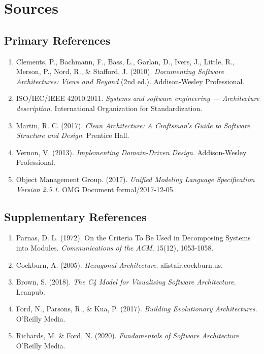 \documentclass[11pt,letterpaper]{article}
\begin{document}
\section{Sources}

\subsection{Primary References}

\begin{enumerate}
    \item Clements, P., Bachmann, F., Bass, L., Garlan, D., Ivers, J., Little, R., Merson, P., Nord, R., \& Stafford, J. (2010). \textit{Documenting Software Architectures: Views and Beyond} (2nd ed.). Addison-Wesley Professional.
    
    \item ISO/IEC/IEEE 42010:2011. \textit{Systems and software engineering --- Architecture description}. International Organization for Standardization.
    
    \item Martin, R. C. (2017). \textit{Clean Architecture: A Craftsman's Guide to Software Structure and Design}. Prentice Hall.
    
    \item Vernon, V. (2013). \textit{Implementing Domain-Driven Design}. Addison-Wesley Professional.
    
    \item Object Management Group. (2017). \textit{Unified Modeling Language Specification Version 2.5.1}. OMG Document formal/2017-12-05.
\end{enumerate}

\subsection{Supplementary References}

\begin{enumerate}[resume]
    \item Parnas, D. L. (1972). On the Criteria To Be Used in Decomposing Systems into Modules. \textit{Communications of the ACM}, 15(12), 1053-1058.
    
    \item Cockburn, A. (2005). \textit{Hexagonal Architecture}. alistair.cockburn.us.
    
    \item Brown, S. (2018). \textit{The C4 Model for Visualising Software Architecture}. Leanpub.
    
    \item Ford, N., Parsons, R., \& Kua, P. (2017). \textit{Building Evolutionary Architectures}. O'Reilly Media.
    
    \item Richards, M. \& Ford, N. (2020). \textit{Fundamentals of Software Architecture}. O'Reilly Media.
\end{enumerate}
\end{document}
